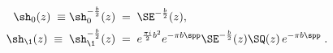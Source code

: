 \begin{equation}\label{auxfields}
\begin{aligned}
\sh_0(z)\; \equiv & \;\sh^{-\frac{b}{2}}_0(z)\;=\;\SE^{-\frac{b}{2}}(z),
\\
\sh_\1(z)\; \equiv \;& \;\sh^{-\frac{b}{2}}_\1(z)\;=\;
e^{\frac{\pi i}{2}b^2}
e^{-\pi b\spp}\SE^{-\frac{b}{2}}(z)\SQ(z)\,e^{-\pi b\spp}\;. 
\end{aligned}
\end{equation}

